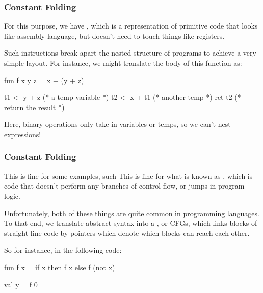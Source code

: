 \documentclass[aspectratio=169]{beamer}
\begin{document}
\begin{frame}[fragile]
  \frametitle{Constant Folding}

  For this purpose, we have , which is a representation
  of primitive code that looks like assembly language, but doesn't need to
  touch things like registers.

  \vspace{\fill}

  Such instructions break apart the nested structure of programs to achieve
  a very simple layout. For instance, we might translate the body of this function as:
  \begin{codeblock}
    fun f x y z =
      x + (y + z)
  \end{codeblock}

  \vspace{\fill}

  \begin{codeblock}
    t1 <- y + z   (* a temp variable *)
    t2 <- x + t1  (* another temp *)
    ret t2        (* return the result *)
  \end{codeblock}

  \vspace{\fill}

  Here, binary operations only take in variables or temps, so we can't
  nest expressions!
\end{frame}

\begin{frame}[fragile]
  \frametitle{Constant Folding}

  This is fine for some examples, such
  This is fine for what is known as , which is code
  that doesn't perform any branches of control flow, or jumps in program logic.

  \vspace{\fill}

  Unfortunately, both of these things are quite common in programming languages.
  To that end, we translate abstract syntax into a ,
  or CFGs, which links blocks of straight-line code by pointers which denote
  which blocks can reach each other.

  \vspace{\fill}

  So for instance, in the following code:
  \begin{codeblock}
    fun f x =
      if x then f x
      else f (not x)

    val y = f 0
  \end{codeblock}
\end{frame}
\end{document}
